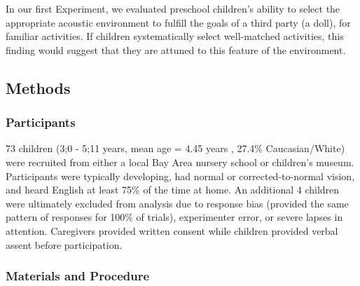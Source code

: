 \documentclass[10pt, letterpaper]{article}
\begin{document}
In our first Experiment, we evaluated preschool children's ability to
select the appropriate acoustic environment to fulfill the goals of a
third party (a doll), for familiar activities. If children
systematically select well-matched activities, this finding would
suggest that they are attuned to this feature of the environment.

\hypertarget{methods}{%
\subsection{Methods}\label{methods}}

\hypertarget{participants}{%
\subsubsection{Participants}\label{participants}}

73 children (3;0 - 5;11 years, mean age = 4.45 years , 27.4\%
Caucasian/White) were recruited from either a local Bay Area nursery
school or children's museum. Participants were typically developing, had
normal or corrected-to-normal vision, and heard English at least 75\% of
the time at home. An additional 4 children were ultimately excluded from
analysis due to response bias (provided the same pattern of responses
for 100\% of trials), experimenter error, or severe lapses in attention.
Caregivers provided written consent while children provided verbal
assent before participation.

\hypertarget{materials-and-procedure}{%
\subsubsection{Materials and Procedure}\label{materials-and-procedure}}
\end{document}
